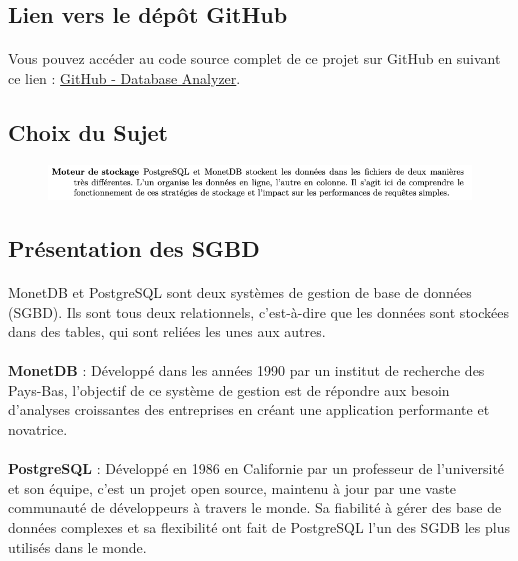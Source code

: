 \documentclass[11pt]{extarticle}
\begin{document}
\subsection{Lien vers le dépôt GitHub}
\paragraph{}
Vous pouvez accéder au code source complet de ce projet sur GitHub en suivant ce lien : \href{https://github.com/GregoireBDN/Database-Analyzer}{GitHub - Database Analyzer}.

\subsection{Choix du Sujet}

\begin{figure}[H]
    \centering
    \includegraphics[width=1\textwidth]{images/Sujet.png}
    \label{fig:sujet}
\end{figure}

\subsection{Présentation des SGBD}

\paragraph{} 
MonetDB et PostgreSQL sont deux systèmes de gestion de base de données (SGBD). Ils sont tous deux relationnels, c'est-à-dire que les données sont stockées dans des tables, qui sont reliées les unes aux autres.

\paragraph{} 
\textbf{MonetDB} : Développé dans les années 1990 par un institut de recherche des Pays-Bas, l'objectif de ce système de gestion est de répondre aux besoin d'analyses croissantes des entreprises en créant une application performante et novatrice.

\paragraph{} 
\textbf{PostgreSQL} : Développé en 1986 en Californie par un professeur de l'université et son équipe, c'est un projet open source, maintenu à jour par une vaste communauté de développeurs à travers le monde. Sa fiabilité à gérer des base de données complexes et sa flexibilité ont fait de PostgreSQL l'un des SGDB les plus utilisés dans le monde.
\end{document}
